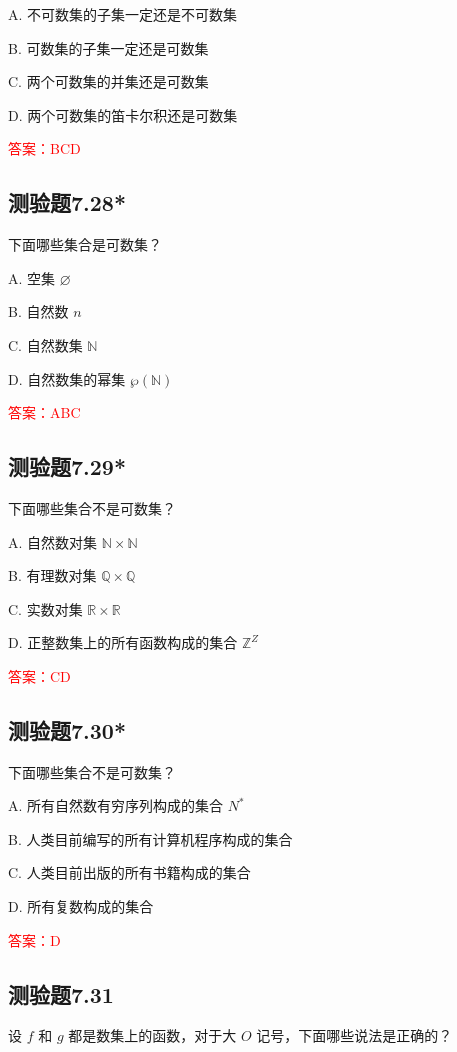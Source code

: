 \documentclass[UTF8, heading=true]{ctexart}
\begin{document}
A. 不可数集的子集一定还是不可数集

B. 可数集的子集一定还是可数集

C. 两个可数集的并集还是可数集

D. 两个可数集的笛卡尔积还是可数集

\textcolor{red}{答案：BCD}

\subsection{测验题7.28*}

下面哪些集合是可数集？

A. 空集 $\varnothing$

B. 自然数 $n$

C. 自然数集 $\mathbb{N}$

D. 自然数集的幂集 $\wp(\mathbb{N})$

\textcolor{red}{答案：ABC}

\subsection{测验题7.29*}

下面哪些集合不是可数集？

A. 自然数对集 $\mathbb{N} \times \mathbb{N}$

B. 有理数对集 $\mathbb{Q} \times \mathbb{Q}$

C. 实数对集 $\mathbb{R} \times \mathbb{R}$

D. 正整数集上的所有函数构成的集合 $\mathbb{Z}^Z$

\textcolor{red}{答案：CD}

\subsection{测验题7.30*}

下面哪些集合不是可数集？

A. 所有自然数有穷序列构成的集合 $N^*$

B. 人类目前编写的所有计算机程序构成的集合

C. 人类目前出版的所有书籍构成的集合

D. 所有复数构成的集合

\textcolor{red}{答案：D}

\subsection{测验题7.31}

设 $f$ 和 $g$ 都是数集上的函数，对于大 $O$ 记号，下面哪些说法是正确的？
\end{document}
